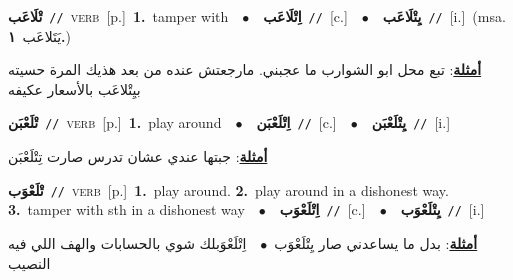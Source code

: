 \documentclass[10pt,a4paper,twoside]{article} %
\begin{document}
\begin{multicols}{2}
{\setlength\topsep{0pt}\textbf{\foreignlanguage{arabic}{تْلَاعَب}}\ {\color{gray}\texttt{//}\color{black}}\ \textsc{verb}\ [p.]\ \textbf{1.}~tamper with\ \ $\bullet$\ \ \setlength\topsep{0pt}\textbf{\foreignlanguage{arabic}{اِتْلَاعَب}}\ {\color{gray}\texttt{//}\color{black}}\ [c.]\ \ $\bullet$\ \ \setlength\topsep{0pt}\textbf{\foreignlanguage{arabic}{يِتْلَاعَب}}\ {\color{gray}\texttt{//}\color{black}}\ [i.]\ \color{gray}(msa. \foreignlanguage{arabic}{يَتَلاعَب}~\foreignlanguage{arabic}{\textbf{١.}})\color{black}\  \begin{flushright}\color{gray}\foreignlanguage{arabic}{\textbf{\underline{\foreignlanguage{arabic}{أمثلة}}}: تبع محل ابو الشوارب ما عجبني. مارجعتش عنده من بعد هذيك المرة حسيته بيِتْلاعَب بالأسعار عكيفه}\end{flushright}\color{black}} \vspace{2mm}

{\setlength\topsep{0pt}\textbf{\foreignlanguage{arabic}{تْلَعْبَن}}\ {\color{gray}\texttt{//}\color{black}}\ \textsc{verb}\ [p.]\ \textbf{1.}~play around\ \ $\bullet$\ \ \setlength\topsep{0pt}\textbf{\foreignlanguage{arabic}{اِتْلَعْبَن}}\ {\color{gray}\texttt{//}\color{black}}\ [c.]\ \ $\bullet$\ \ \setlength\topsep{0pt}\textbf{\foreignlanguage{arabic}{يِتْلَعْبَن}}\ {\color{gray}\texttt{//}\color{black}}\ [i.]\  \begin{flushright}\color{gray}\foreignlanguage{arabic}{\textbf{\underline{\foreignlanguage{arabic}{أمثلة}}}: جبتها عندي عشان تدرس صارت تِتْلَعْبَن}\end{flushright}\color{black}} \vspace{2mm}

{\setlength\topsep{0pt}\textbf{\foreignlanguage{arabic}{تْلَعْوَب}}\ {\color{gray}\texttt{//}\color{black}}\ \textsc{verb}\ [p.]\ \textbf{1.}~play around.  \textbf{2.}~play around in a dishonest way.  \textbf{3.}~tamper with sth in a dishonest way\ \ $\bullet$\ \ \setlength\topsep{0pt}\textbf{\foreignlanguage{arabic}{اِتْلَعْوَب}}\ {\color{gray}\texttt{//}\color{black}}\ [c.]\ \ $\bullet$\ \ \setlength\topsep{0pt}\textbf{\foreignlanguage{arabic}{يِتْلَعْوَب}}\ {\color{gray}\texttt{//}\color{black}}\ [i.]\  \begin{flushright}\color{gray}\foreignlanguage{arabic}{\textbf{\underline{\foreignlanguage{arabic}{أمثلة}}}: بدل ما يساعدني صار يِتْلَعْوَب\ $\bullet$\ \  اِتْلَعْوَبلك شوي بالحسابات والهف اللي فيه النصيب}\end{flushright}\color{black}} \vspace{2mm}


\end{multicols}
\end{document}
